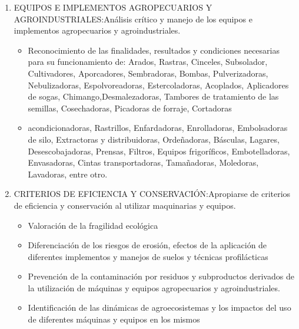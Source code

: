 \documentclass[../main]{subfiles}
\begin{document}
\begin{enumerate}
\begin{itemize}
\begin{itemize}
    \end{itemize}
    \end{itemize}
    \item EQUIPOS E IMPLEMENTOS AGROPECUARIOS Y AGROINDUSTRIALES:Análisis crítico y manejo de los equipos e implementos agropecuarios y agroindustriales. 
    \begin{itemize}
        \item  Reconocimiento de las finalidades, resultados y
condiciones necesarias para su funcionamiento de:
Arados, Rastras, Cinceles, Subsolador, Cultivadores,
Aporcadores, Sembradoras, Bombas, Pulverizadoras,
Nebulizadoras, Espolvoreadoras, Estercoladoras,
Acoplados, Aplicadores de sogas, Chimango,Desmalezadoras, Tambores de tratamiento de las
semillas, Cosechadoras, Picadoras de forraje, Cortadoras
\item acondicionadoras, Rastrillos, Enfardadoras,
Enrolladoras, Embolsadoras de silo, Extractoras y
distribuidoras, Ordeñadoras, Básculas, Lagares,
Desescobajadoras, Prensas, Filtros, Equipos frigoríficos,
Embotelladoras, Envasadoras, Cintas transportadoras,
Tamañadoras, Moledoras, Lavadoras, entre otro. 
    \end{itemize}
    \item CRITERIOS DE EFICIENCIA Y CONSERVACIÓN:Apropiarse de criterios de eficiencia y conservación al utilizar maquinarias y equipos. 
 \begin{itemize}
     \item Valoración de la fragilidad ecológica
\item Diferenciación de los riesgos de erosión, efectos de la
aplicación de diferentes implementos y manejos de
suelos y técnicas profilácticas
\item Prevención de la contaminación por residuos y
subproductos derivados de la utilización de máquinas y
equipos agropecuarios y agroindustriales.
\item Identificación de las dinámicas de agroecosistemas y los
impactos del uso de diferentes máquinas y equipos en los
mismos
 \end{itemize}
\end{enumerate}
\end{document}
